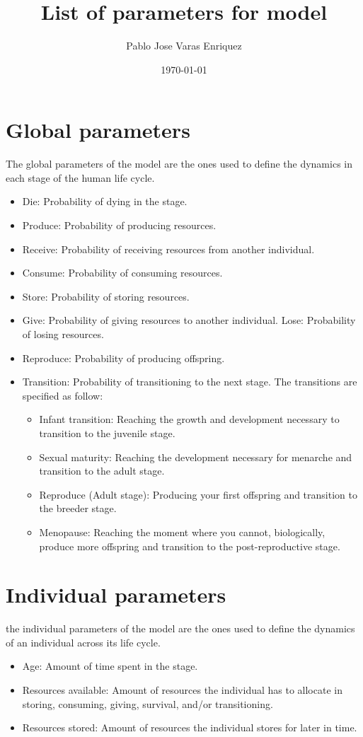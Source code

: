 \documentclass{article}
\title{List of parameters for model}
\author{Pablo Jose Varas Enriquez}
\date{\today}
\begin{document}
\maketitle

\section{Global parameters}

The global parameters of the model are the ones used to define the dynamics in each stage of the human life cycle.

\begin{itemize}
    \item Die: Probability of dying in the stage.
    \item Produce: Probability of producing resources.
    \item Receive: Probability of receiving resources from another individual.
    \item Consume: Probability of consuming resources.
    \item Store: Probability of storing resources.
    \item Give: Probability of giving resources to another individual.
    \itme Lose: Probability of losing resources.
    \item Reproduce: Probability of producing offspring.
    \item Transition: Probability of transitioning to the next stage. The transitions are specified as follow:
    \begin{itemize}
        \item Infant transition: Reaching the growth and development necessary to transition to the juvenile stage.
        \item Sexual maturity: Reaching the development necessary for menarche and transition to the adult stage.
        \item Reproduce (Adult stage): Producing your first offspring and transition to the breeder stage.
        \item Menopause: Reaching the moment where you cannot, biologically, produce more offspring and transition to the post-reproductive stage.
    \end{itemize}
\end{itemize}

\section{Individual parameters}

the individual parameters of the model are the ones used to define the dynamics of an individual across its life cycle.

\begin{itemize}
    \item Age: Amount of time spent in the stage.
    \item Resources available: Amount of resources the individual has to allocate in storing, consuming, giving, survival, and/or transitioning.
    \item Resources stored: Amount of resources the individual stores for later in time.
\end{itemize}
\end{document}
